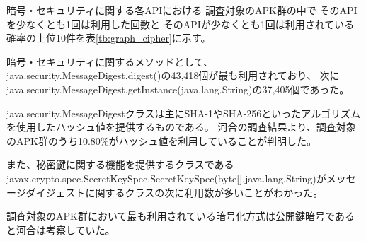 暗号・セキュリティに関する各APIにおける
調査対象のAPK群の中で
そのAPIを少なくとも1回は利用した回数と
そのAPIが少なくとも1回は利用されている確率の上位10件を表\ref{tb:graph_cipher}に示す。

暗号・セキュリティに関するメソッドとして、
java.security.MessageDigest.digest()の43,418個が最も利用されており、
次にjava.security.MessageDigest.getInstance(java.lang.String)の37,405個であった。

java.security.MessageDigestクラスは主にSHA-1やSHA-256といったアルゴリズムを使用したハッシュ値を提供するものである。
河合の調査結果より、調査対象のAPK群のうち10.80\%がハッシュ値を利用していることが判明した。

また、秘密鍵に関する機能を提供するクラスであるjavax.crypto.spec.SecretKeySpec.SecretKeySpec(byte[],java.lang.String)がメッセージダイジェストに関するクラスの次に利用数が多いことがわかった。

調査対象のAPK群において最も利用されている暗号化方式は公開鍵暗号であると河合は考察していた。

